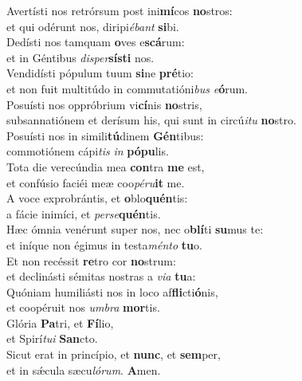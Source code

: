 \evenverse Avertísti nos retrórsum post ini\textbf{mí}cos \textbf{no}stros:~\*\\
\evenverse et qui odérunt nos, diripi\textit{é}\textit{bant} \textbf{si}bi.\\
\oddverse Dedísti nos tamquam \textbf{o}ves e\textbf{scá}rum:~\*\\
\oddverse et in Géntibus \textit{di}\textit{sper}\textbf{sí}\textbf{sti} nos.\\
\evenverse Vendidísti pópulum tuum \textbf{si}ne \textbf{pré}tio:~\*\\
\evenverse et non fuit multitúdo in commutatióni\textit{bus} \textit{e}\textbf{ó}rum.\\
\oddverse Posuísti nos oppróbrium vi\textbf{cí}nis \textbf{no}stris,~\*\\
\oddverse subsannatiónem et derísum his, qui sunt in circú\textit{i}\textit{tu} \textbf{no}stro.\\
\evenverse Posuísti nos in simili\textbf{tú}dinem \textbf{Gén}tibus:~\*\\
\evenverse commotiónem cápi\textit{tis} \textit{in} \textbf{pó}\textbf{pu}lis.\\
\oddverse Tota die verecúndia mea \textbf{con}tra \textbf{me} est,~\*\\
\oddverse et confúsio faciéi meæ coo\textit{pé}\textit{ru}\textbf{it} me.\\
\evenverse A voce exprobrántis, et \textbf{o}blo\textbf{quén}tis:~\*\\
\evenverse a fácie inimíci, et \textit{per}\textit{se}\textbf{quén}tis.\\
\oddverse Hæc ómnia venérunt super nos, nec o\textbf{blí}ti \textbf{su}mus te:~\*\\
\oddverse et iníque non égimus in testa\textit{mén}\textit{to} \textbf{tu}o.\\
\evenverse Et non recéssit \textbf{re}tro cor \textbf{no}strum:~\*\\
\evenverse et declinásti sémitas nostras a \textit{vi}\textit{a} \textbf{tu}a:\\
\oddverse Quóniam humiliásti nos in loco af\textbf{fli}cti\textbf{ó}nis,~\*\\
\oddverse et coopéruit nos \textit{um}\textit{bra} \textbf{mor}tis.\\
\evenverse Glória \textbf{Pa}tri, et \textbf{Fí}lio,~\*\\
\evenverse et Spirí\textit{tu}\textit{i} \textbf{San}cto.\\
\oddverse Sicut erat in princípio, et \textbf{nunc}, et \textbf{sem}per,~\*\\
\oddverse et in sǽcula sæcu\textit{ló}\textit{rum}. \textbf{A}men.\\
